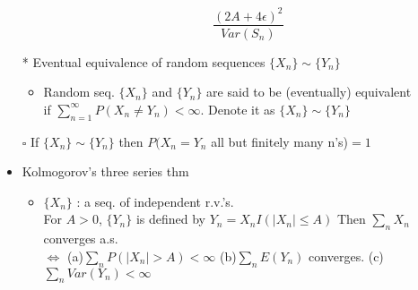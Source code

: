 \documentclass[12pt, A4]{article}
\begin{document}
\begin{itemize}
\begin{itemize}
$$		\frac{(2A+4\epsilon)^2}{Var(S_n)}$$
	\end{itemize}
	\item[*] Eventual equivalence of random sequences $\{X_n\}\sim\{Y_n\}$
	\begin{itemize}
		\item Random seq. $\{X_n\}$ and $\{Y_n\}$ are said to be (eventually) equivalent \\if $\sum_{n=1}^{\infty}P(X_n\neq Y_n)<\infty$. Denote it as  $\{X_n\}\sim\{Y_n\}$
	\end{itemize}
	\item[$\square$] If $\{X_n\}\sim\{Y_n\}$ then $P(X_n=Y_n$ all but finitely many n's)$=1$
	\item Kolmogorov's three series thm
	\begin{itemize}
		\item $\{X_n\}$ : a seq. of independent r.v.'s. \\ For $A>0$, $\{Y_n\}$ is defined by $Y_n= X_nI(|X_n|\leq A)$  Then $\sum_n X_n$ converges a.s.\\ $\Leftrightarrow$ (a)$\sum_n P(|X_n|>A)<\infty$ (b)$\sum_n E(Y_n)$ converges. (c) $\sum_n Var(Y_n)<\infty $
	\end{itemize}
\end{itemize}

\bigskip
\end{document}
